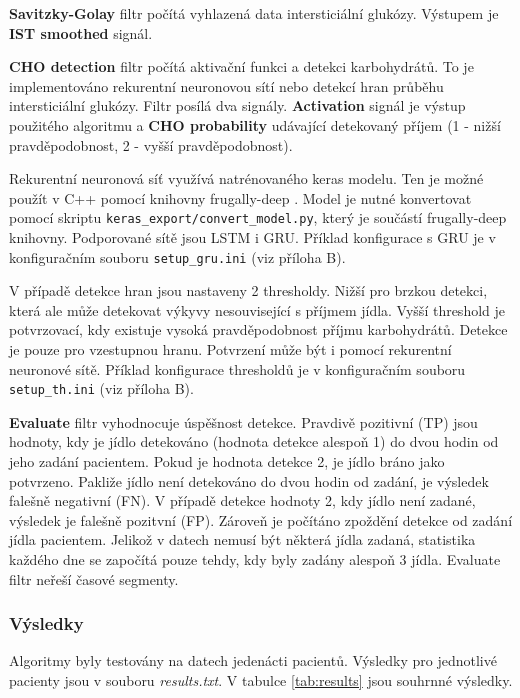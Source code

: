 \textbf{Savitzky-Golay} filtr počítá vyhlazená data intersticiální glukózy. Výstupem je \textbf{IST smoothed} signál.

\textbf{CHO detection} filtr počítá aktivační funkci a detekci karbohydrátů. To je implementováno rekurentní neuronovou sítí nebo detekcí hran průběhu intersticiální glukózy. Filtr posílá dva signály. \textbf{Activation} signál je výstup použitého algoritmu a \textbf{CHO probability} udávající detekovaný příjem (1 - nižší pravděpodobnost, 2 - vyšší pravděpodobnost).

Rekurentní neuronová síť využívá natrénovaného keras modelu. Ten je možné použít v C++ pomocí knihovny frugally-deep \citep{cho.frugally}. Model je nutné konvertovat pomocí skriptu \texttt{keras\_export/convert\_model.py}, který je součástí frugally-deep knihovny. Podporované sítě jsou LSTM i GRU. Příklad konfigurace s GRU je v konfiguračním souboru \texttt{setup\_gru.ini} (viz příloha B).
 
V případě detekce hran jsou nastaveny 2 thresholdy. Nižší pro brzkou detekci, která ale může detekovat výkyvy nesouvisející s příjmem jídla. Vyšší threshold je potvrzovací, kdy existuje vysoká pravděpodobnost příjmu karbohydrátů. Detekce je pouze pro vzestupnou hranu. Potvrzení může být i pomocí rekurentní neuronové sítě. Příklad konfigurace thresholdů je v konfiguračním souboru \texttt{setup\_th.ini} (viz příloha B).

\textbf{Evaluate} filtr vyhodnocuje úspěšnost detekce. Pravdivě pozitivní (TP) jsou hodnoty, kdy je jídlo detekováno (hodnota detekce alespoň 1) do dvou hodin od jeho zadání pacientem. Pokud je hodnota detekce 2, je jídlo bráno jako potvrzeno. Pakliže jídlo není detekováno do dvou hodin od zadání, je výsledek falešně negativní (FN). V případě detekce hodnoty 2, kdy jídlo není zadané, výsledek je falešně pozitvní (FP). Zároveň je počítáno zpoždění detekce od zadání jídla pacientem. Jelikož v datech nemusí být některá jídla zadaná, statistika každého dne se započítá pouze tehdy, kdy byly zadány alespoň 3 jídla. Evaluate filtr neřeší časové segmenty.

\subsubsection{Výsledky}

Algoritmy byly testovány na datech jedenácti pacientů. Výsledky pro jednotlivé pacienty jsou v souboru \textit{results.txt}. V tabulce \ref{tab:results} jsou souhrnné výsledky.

